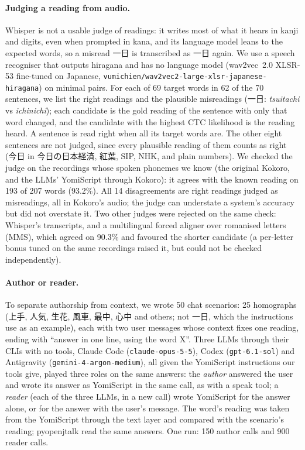 \documentclass[11pt,a4paper]{article}
\begin{document}
\paragraph{Judging a reading from audio.} Whisper is not a usable judge of readings: it writes most of what it hears in
kanji and digits, even when prompted in kana, and its language model leans to the expected words, so a misread 一日
is transcribed as 一日 again. We use a speech recogniser that outputs hiragana and has no language model (wav2vec~2.0
XLSR-53 fine-tuned on Japanese, \texttt{vumichien/wav2vec2-large-xlsr-japanese-hiragana}) on minimal pairs. For each
of 69 target words in 62 of the 70 sentences, we list the right readings and the plausible misreadings (一日:
\emph{tsuitachi} vs \emph{ichinichi}); each candidate is the gold reading of the sentence with only that word changed,
and the candidate with the highest CTC likelihood is the reading heard. A sentence is read right when all its target
words are. The other eight sentences are not judged, since every plausible reading of them counts as right (今日 in
今日の日本経済, 紅葉, SIP, NHK, and plain numbers). We checked the judge on the recordings whose spoken phonemes we
know (the original Kokoro, and the LLMs' YomiScript through Kokoro): it agrees with the known reading on 193 of 207
words (93.2\%). All 14 disagreements are right readings judged as misreadings, all in Kokoro's audio; the judge can
understate a system's accuracy but did not overstate it. Two other judges were rejected on the same check: Whisper's
transcripts, and a multilingual forced aligner over romanised letters (MMS), which agreed on 90.3\% and favoured the
shorter candidate (a per-letter bonus tuned on the same recordings raised it, but could not be checked independently).

\paragraph{Author or reader.} To separate authorship from context, we wrote 50 chat scenarios: 25 homographs (上手,
人気, 生花, 風車, 最中, 心中 and others; not 一日, which the instructions use as an example), each with two user messages
whose context fixes one reading, ending with ``answer in one line, using the word X''. Three LLMs through their CLIs
with no tools, Claude Code (\texttt{claude-opus-5-5}), Codex (\texttt{gpt-6.1-sol}) and Antigravity
(\texttt{gemini-4-argon-medium}), all given the YomiScript instructions our tools give, played three roles on the same
answers: the \emph{author} answered the user and wrote its answer as YomiScript in the same call, as with a speak
tool; a \emph{reader} (each of the three LLMs, in a new call) wrote YomiScript for the answer alone, or for the answer
with the user's message. The word's reading was taken from the YomiScript through the text layer and compared with
the scenario's reading; pyopenjtalk read the same answers. One run: 150 author calls and 900 reader calls.
\end{document}
